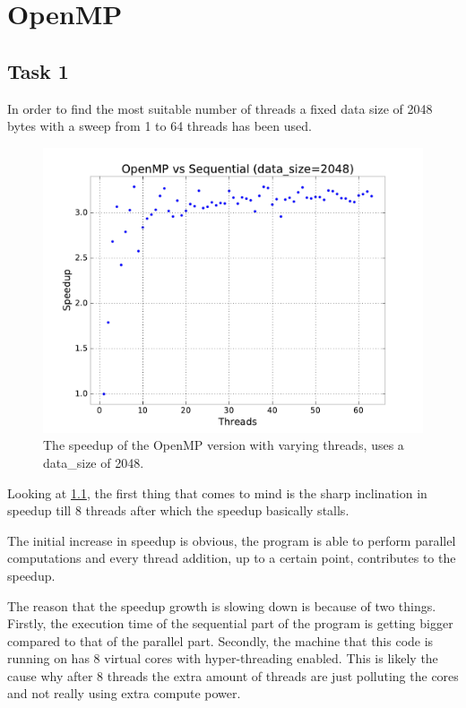 \documentclass[final]{report}
\begin{document}
\chapter{OpenMP}
\section{Task 1}
In order to find the most suitable number of threads a fixed data size of 2048 bytes with a sweep from 1 to 64 threads has been used.
\begin{figure}[H]
\centering
    \includegraphics[width=\linewidth]{resources/openmp-number-of-threads-sweep.pdf}
    \caption{The speedup of the OpenMP version with varying threads, uses a data\_size of 2048.}
    \label{fig:openmp-number-of-threads-sweep}
\end{figure}
Looking at \cref{fig:openmp-number-of-threads-sweep}, the first thing that comes to mind is the sharp inclination in speedup till 8 threads after which the speedup basically stalls.

The initial increase in speedup is obvious, the program is able to perform parallel computations and every thread addition, up to a certain point, contributes to the speedup.

The reason that the speedup growth is slowing down is because of two things.
Firstly, the execution time of the sequential part of the program is getting bigger compared to that of the parallel part.
Secondly, the machine that this code is running on has 8 virtual cores with hyper-threading enabled.
This is likely the cause why after 8 threads the extra amount of threads are just polluting the cores and not really using extra compute power.
\end{document}
